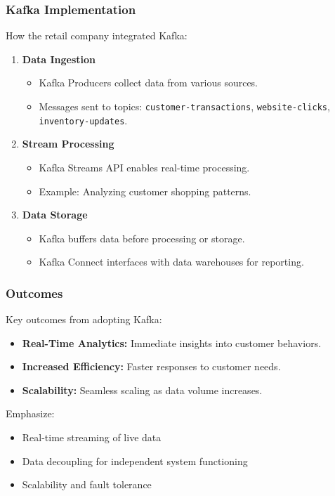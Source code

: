 \documentclass[aspectratio=169]{beamer}
\begin{document}
\begin{frame}
  \frametitle{Kafka Implementation}
  How the retail company integrated Kafka:
  
  \begin{enumerate}
    \item \textbf{Data Ingestion}
      \begin{itemize}
        \item Kafka Producers collect data from various sources.
        \item Messages sent to topics: \texttt{customer-transactions}, \texttt{website-clicks}, \texttt{inventory-updates}.
      \end{itemize}
    \item \textbf{Stream Processing}
      \begin{itemize}
        \item Kafka Streams API enables real-time processing.
        \item Example: Analyzing customer shopping patterns.
      \end{itemize}
    \item \textbf{Data Storage}
      \begin{itemize}
        \item Kafka buffers data before processing or storage.
        \item Kafka Connect interfaces with data warehouses for reporting.
      \end{itemize}
  \end{enumerate}
\end{frame}

\begin{frame}
  \frametitle{Outcomes}
  Key outcomes from adopting Kafka:
  
  \begin{itemize}
    \item \textbf{Real-Time Analytics:} Immediate insights into customer behaviors.
    \item \textbf{Increased Efficiency:} Faster responses to customer needs.
    \item \textbf{Scalability:} Seamless scaling as data volume increases.
  \end{itemize}
  
  Emphasize:
  \begin{itemize}
    \item Real-time streaming of live data
    \item Data decoupling for independent system functioning
    \item Scalability and fault tolerance
  \end{itemize}
\end{frame}
\end{document}
